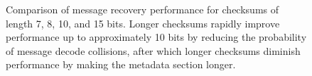 \documentclass[titlepage]{article}
\begin{document}
\begin{figure}
{}
\caption{Comparison of message recovery performance for checksums of length 7, 8, 10, and 15 bits. Longer checksums rapidly improve performance up to approximately 10 bits by reducing the probability of message decode collisions, after which longer checksums diminish performance by making the metadata section longer.}
\label{fig:checksum}
\end{figure}
\end{document}
